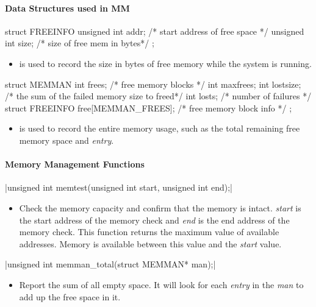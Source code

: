 \documentclass{swfcthesis}
\begin{document}
\paragraph{Data Structures used in MM}

\begin{codeblock}[1]
\begin{ccode}
struct FREEINFO
{ 
  unsigned int addr; /* start address of free space */
  unsigned int size; /* size of free mem in bytes*/
};
\end{ccode}
\end{codeblock}
\begin{itemize}
\item %
  is used to record the size in bytes of free memory while
  the system is running.
\end{itemize}

\begin{codeblock}[1]
\begin{ccode}
struct MEMMAN
{ 
  int frees;    /* free memory blocks */
  int maxfrees; 
  int lostsize; /* the sum of the failed memory size to freed*/
  int losts;    /* number of failures */
  struct FREEINFO free[MEMMAN_FREES]; /* free memory block info */
};
\end{ccode}
\end{codeblock}
\begin{itemize}
\item is used to record the entire
  memory usage, such as the total remaining free memory space and \emph{entry}.
\end{itemize}

\paragraph{Memory Management Functions}
\csingle|unsigned int memtest(unsigned int start, unsigned int end);|
\begin{itemize}
\item Check the memory capacity and confirm that the memory is intact. \emph{start} is the start
  address of the memory check and \emph{end} is the end address of the memory
  check. This function returns the maximum value of available addresses. Memory is
  available between this value and the \emph{start} value.
\end{itemize}


\csingle|unsigned int memman_total(struct MEMMAN* man);|
\begin{itemize}
\item Report the sum of all empty space. It will look for each \emph{entry} in the
  \emph{man} to add up the free space in it.
  
\end{itemize}
\end{document}
